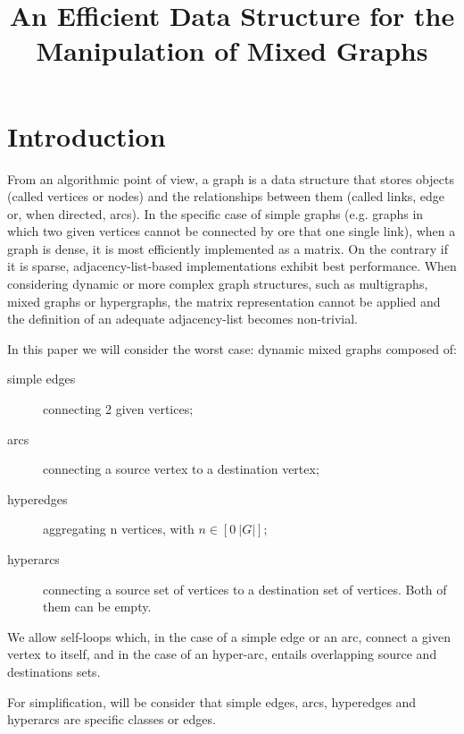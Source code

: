 \documentclass{article}
\title{An Efficient Data Structure for the Manipulation of Mixed Graphs}
\begin{document}
\maketitle
\vfill

\begin{abstract}

\end{abstract}

\vfill

\begin{footnotesize}
\tableofcontents
\end{footnotesize}


\newpage

\section{Introduction}

From an algorithmic point of view, a graph is a data structure that stores
objects (called vertices or nodes) and the relationships between them (called links, edge or,
when directed, arcs). In the specific case of simple graphs (e.g. graphs
in which two given vertices cannot be connected by ore that one single
link), when a graph is dense, it is most efficiently implemented as a matrix. On
the contrary if it is sparse, adjacency-list-based implementations exhibit
best performance. When considering dynamic or more complex graph structures,
such as multigraphs, mixed graphs or hypergraphs, the matrix representation cannot be
applied and the definition of an adequate adjacency-list becomes non-trivial.

In this paper we will consider the worst case: dynamic mixed graphs composed of:
\begin{description}
  \item[simple edges]  connecting 2 given vertices;
  \item[arcs]  connecting a source vertex to a destination vertex;
  \item[hyperedges] aggregating n vertices, with $n \in [0\ |G|]$; 
  \item[hyperarcs] connecting a source set of vertices to a destination set of
  vertices. Both of them can be empty.
\end{description}

We allow self-loops which, in the case of a simple edge or an arc, connect a
given vertex to itself, and in the case of an hyper-arc, entails overlapping
source and destinations sets.

For simplification, will be consider that simple edges, arcs, hyperedges and
hyperarcs are specific classes or edges.
\end{document}
